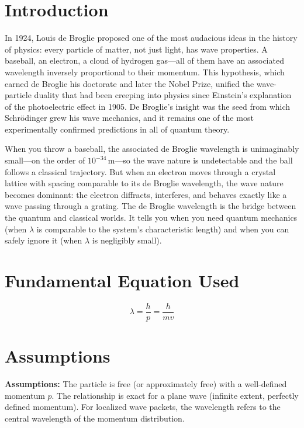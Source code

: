 \documentclass[11pt,openright]{book}
\begin{document}
\section*{Introduction}

In 1924, Louis de Broglie proposed one of the most audacious ideas in the history of physics: every particle of matter, not just light, has wave properties. A baseball, an electron, a cloud of hydrogen gas---all of them have an associated wavelength inversely proportional to their momentum. This hypothesis, which earned de Broglie his doctorate and later the Nobel Prize, unified the wave-particle duality that had been creeping into physics since Einstein's explanation of the photoelectric effect in 1905. De Broglie's insight was the seed from which Schrödinger grew his wave mechanics, and it remains one of the most experimentally confirmed predictions in all of quantum theory.

When you throw a baseball, the associated de Broglie wavelength is unimaginably small---on the order of $10^{-34}\,\text{m}$---so the wave nature is undetectable and the ball follows a classical trajectory. But when an electron moves through a crystal lattice with spacing comparable to its de Broglie wavelength, the wave nature becomes dominant: the electron diffracts, interferes, and behaves exactly like a wave passing through a grating. The de Broglie wavelength is the bridge between the quantum and classical worlds. It tells you when you need quantum mechanics (when $\lambda$ is comparable to the system's characteristic length) and when you can safely ignore it (when $\lambda$ is negligibly small).
\section*{Fundamental Equation Used}

\begin{equation}
\lambda = \frac{h}{p} = \frac{h}{mv}
\end{equation}
\section*{Assumptions}

\textbf{Assumptions:} The particle is free (or approximately free) with a well-defined momentum $p$. The relationship is exact for a plane wave (infinite extent, perfectly defined momentum). For localized wave packets, the wavelength refers to the central wavelength of the momentum distribution.
\end{document}
